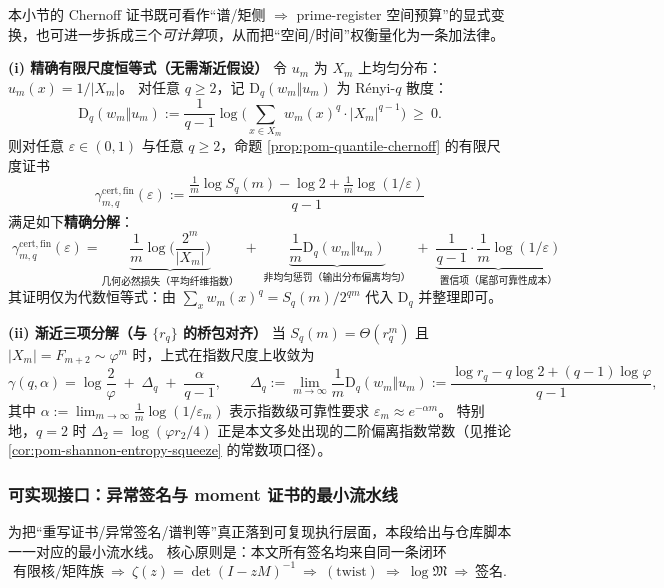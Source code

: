 \begin{remark}\label{rem:pom-quantile-budget-three-term}
本小节的 Chernoff 证书既可看作“谱/矩侧 \(\Rightarrow\) prime-register 空间预算”的显式变换，也可进一步拆成三个\emph{可计算}项，从而把“空间/时间”权衡量化为一条加法律。

\medskip\noindent\textbf{(i) 精确有限尺度恒等式（无需渐近假设）}
令 \(u_m\) 为 \(X_m\) 上均匀分布：\(u_m(x)=1/|X_m|\)。
对任意 \(q\ge 2\)，记 \(\mathrm{D}_q(w_m\Vert u_m)\) 为 R\'enyi-\(q\) 散度：
\[
\mathrm{D}_q(w_m\Vert u_m)
:=\frac{1}{q-1}\log\Big(\sum_{x\in X_m}w_m(x)^q\cdot |X_m|^{q-1}\Big)
\ \ge\ 0.
\]
则对任意 \(\varepsilon\in(0,1)\) 与任意 \(q\ge 2\)，命题 \ref{prop:pom-quantile-chernoff} 的有限尺度证书
\[
\gamma^{\mathrm{cert,fin}}_{m,q}(\varepsilon)
:=\frac{\frac{1}{m}\log S_q(m)-\log 2+\frac{1}{m}\log(1/\varepsilon)}{q-1}
\]
满足如下\textbf{精确分解}：
\[
\boxed{\;
\gamma^{\mathrm{cert,fin}}_{m,q}(\varepsilon)
=
\underbrace{\frac{1}{m}\log\Big(\frac{2^m}{|X_m|}\Big)}_{\text{几何必然损失（平均纤维指数）}}
\;+\;
\underbrace{\frac{1}{m}\mathrm{D}_q(w_m\Vert u_m)}_{\text{非均匀惩罚（输出分布偏离均匀）}}
\;+\;
\underbrace{\frac{1}{q-1}\cdot\frac{1}{m}\log(1/\varepsilon)}_{\text{置信项（尾部可靠性成本）}}
\;}
\]
其证明仅为代数恒等式：由 \(\sum_x w_m(x)^q=S_q(m)/2^{qm}\) 代入 \(\mathrm{D}_q\) 并整理即可。

\medskip\noindent\textbf{(ii) 渐近三项分解（与 \(\{r_q\}\) 的桥包对齐）}
当 \(S_q(m)=\Theta(r_q^m)\) 且 \(|X_m|=F_{m+2}\sim\varphi^m\) 时，上式在指数尺度上收敛为
\[
\gamma(q,\alpha)
=
\log\frac{2}{\varphi}
\;+\;
\Delta_q
\;+\;
\frac{\alpha}{q-1},
\qquad
\Delta_q:=\lim_{m\to\infty}\frac{1}{m}\mathrm{D}_q(w_m\Vert u_m)
:=\frac{\log r_q-q\log 2+(q-1)\log\varphi}{q-1},
\]
其中 \(\alpha:=\lim_{m\to\infty}\frac{1}{m}\log(1/\varepsilon_m)\) 表示指数级可靠性要求 \(\varepsilon_m\approx e^{-\alpha m}\)。
特别地，\(q=2\) 时
\(
\Delta_2=\log(\varphi r_2/4)
\)
正是本文多处出现的二阶偏离指数常数（见推论 \ref{cor:pom-shannon-entropy-squeeze} 的常数项口径）。
\end{remark}

\subsubsection{可实现接口：异常签名与 moment 证书的最小流水线}\label{subsec:pom-implementable-interfaces}

为把“重写证书/异常签名/谱判等”真正落到可复现执行层面，本段给出与仓库脚本一一对应的最小流水线。
核心原则是：本文所有签名均来自同一条闭环
$$
\text{有限核/矩阵族}\ \Longrightarrow\ \zeta(z)=\det(I-zM)^{-1}\ \Longrightarrow\ (\text{twist})\ \Longrightarrow\ \log\mathfrak{M}\ \Longrightarrow\ \text{签名}.
$$

